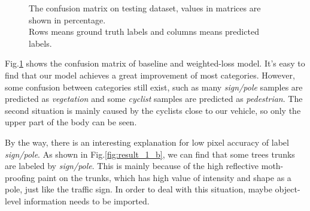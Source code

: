 	\begin{figure} 
		\centering
		\hspace{.5in}
		
		\caption{
			The confusion matrix on testing dataset, values in matrices are shown in percentage.
			\protect\\
			Rows means ground truth labels and columns means predicted labels.
		}
		\label{fig:matrix}
	\end{figure}
	
	Fig.\ref{fig:matrix} shows the confusion matrix of baseline and weighted-loss model. It's easy to find that our model achieves a great improvement of most categories. However, some confusion between categories still exist, such as many \textit{sign/pole} samples are predicted as \textit{vegetation} and some \textit{cyclist} samples are predicted as \textit{pedestrian}. The second situation is mainly caused by the cyclists close to our vehicle, so only the upper part of the body can be seen.
	
	By the way, there is an interesting explanation for low pixel accuracy of label \textit{sign/pole}. As shown in Fig.\ref{fig:result_1_b}, we can find that some trees trunks are labeled by \textit{sign/pole}. This is mainly because of the high reflective moth-proofing paint on the trunks, which has high value of intensity and shape as a pole, just like the traffic sign. In order to deal with this situation, maybe object-level information needs to be imported.
	
